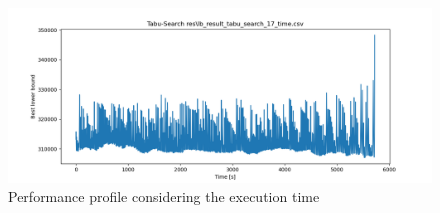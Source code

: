 \begin{figure}[h]
	\centering
	\includegraphics[width=1.0\columnwidth]{../res/gr666_17.png}
	\caption{Performance profile considering the execution time}
	\label{fig:tabu_search_perform_time}
\end{figure}

